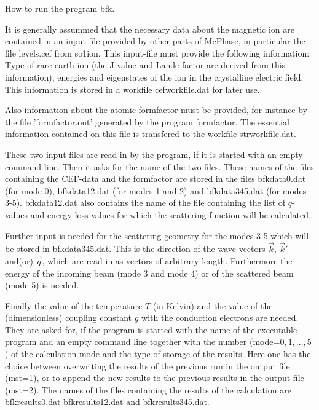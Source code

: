 \bigskip

{\large How  to run the program bfk}.

It is generally assummed that the necessary data 
about the magnetic ion are contained  in an input-file provided by other
parts of McPhase, in particular the file levels.cef from so1ion. 
This input-file must provide the 
following information: Type of rare-earth ion  (the J-value and Lande-factor
are derived from this information), 
energies and eigenstates of the ion in the crystalline electric field. 
This information is stored in a workfile cefworkfile.dat for later use. 

Also
information about the atomic formfactor must be provided, for instance by the
file 'formfactor.out' generated by the program formfactor. The essential
information contained on this file is transfered to the workfile    
strworkfile.dat. 

These two input files are read-in by the program, if it is started with an
empty command-line. Then it asks for the name of the two files.   
These names of the files containing the
CEF-data and the formfactor are stored in the files bfkdata0.dat (for mode
0), bfkdata12.dat (for modes
1 and 2) and
bfkdata345.dat (for modes 3-5).  
 bfkdata12.dat also contains the name of the file containing
the list of $q$-values and energy-loss values for which the scattering
function will be calculated.    

Further input is needed  for the scattering geometry for the modes 3-5 which
will be stored in bfkdata345.dat. This is the direction of the wave vectors 
$\vec k$, $\vec k'$ and(or)
$\vec q$, which are read-in as vectors of arbitrary length. Furthermore
the energy  of the incoming beam (mode 3 and mode 4) or of the scattered beam
(mode 5) is needed. 

Finally the value 
of the temperature $T$ (in Kelvin) and the value of the (dimensionless) 
coupling constant $g$ with the
conduction electrons are needed. They are asked for, if the program is
started with the name of the executable program and an empty command line 
 together with the number (mode=$0,1,\dots ,5$) of the
calculation mode and the type of storage of the results. Here one has the
choice between overwriting the results of the previous run in the output
file (mst=1), or to append the
new results to the previous results in the output file (mst=2). 
The names of the files containing the results of the calculation are
bfkresults0.dat bfkresults12.dat and bfkresults345.dat.

